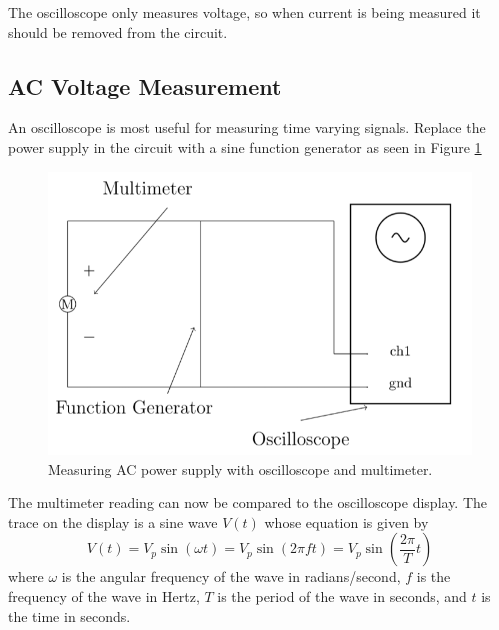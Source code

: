 \begin{note}
    The oscilloscope only measures voltage, so when current is being measured it should be removed from the circuit.
\end{note}

\subsection{AC Voltage Measurement}

An oscilloscope is most useful for measuring time varying signals. Replace the power supply in the circuit with a sine function generator as seen in Figure \ref{fig:ACDC3}

\begin{figure}[H]
    \centering
    \includegraphics[scale = 0.8]{Images/ACDC2.PNG}
    \caption{Measuring AC power supply with oscilloscope and multimeter.}
    \label{fig:ACDC3}
\end{figure}

The multimeter reading can now be compared to the oscilloscope display. The trace on the display is a sine wave $V(t)$ whose equation is given by \begin{equation}\label{eq:ACDC1}
    V(t) = V_p\sin(\omega t) = V_p\sin(2\pi ft) = V_p\sin\left(\frac{2\pi}{T}t\right)
\end{equation}
where $\omega$ is the angular frequency of the wave in radians/second, $f$ is the frequency of the wave in Hertz, $T$ is the period of the wave in seconds, and $t$ is the time in seconds.

